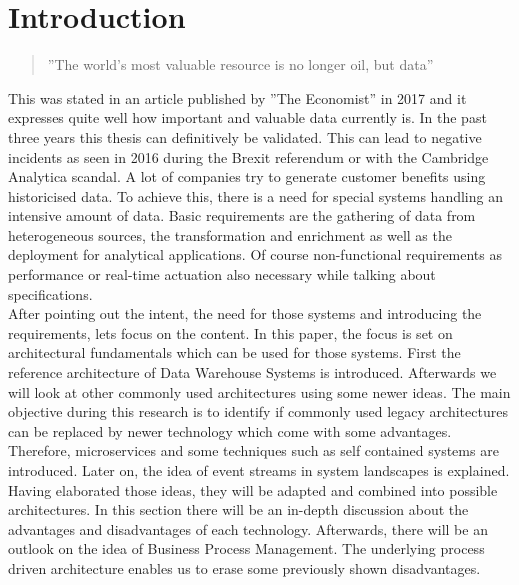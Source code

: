 \section{Introduction}
\label{sec:intro}
\begin{quote}
    ''The world’s most valuable resource is no longer oil, but data'' \cite{dataIsOil}
\end{quote}
This was stated in an article published by ''The Economist'' in 2017 and it expresses quite well how important and valuable data currently is. In the past three years this thesis can definitively be validated. This can lead to negative incidents as seen in 2016 during the Brexit referendum or with the Cambridge Analytica scandal. A lot of companies try to generate customer benefits using historicised data.\newline
To achieve this, there is a need for special systems handling an intensive amount of data. Basic requirements are the gathering of data from heterogeneous sources, the transformation and enrichment as well as the deployment for analytical applications. Of course non-functional requirements as performance or real-time actuation also necessary while talking about specifications.\newline
\\
After pointing out the intent, the need for those systems and introducing the requirements, lets focus on the content. In this paper, the focus is set on architectural fundamentals which can be used for those systems. First the reference architecture of Data Warehouse Systems is introduced. Afterwards we will look at other commonly used architectures using some newer ideas.
The main objective during this research is to identify if commonly used legacy architectures can be replaced by newer technology which come with some advantages.
\newline
Therefore, microservices and some techniques such as self contained systems are introduced. Later on, the idea of event streams in system landscapes is explained.\newline
Having elaborated those ideas, they will be adapted and combined into possible architectures. In this section there will be an in-depth discussion about the advantages and disadvantages of each technology.\newline
Afterwards, there will be an outlook on the idea of Business Process Management. The underlying process driven architecture enables us to erase some previously shown disadvantages.\newline
